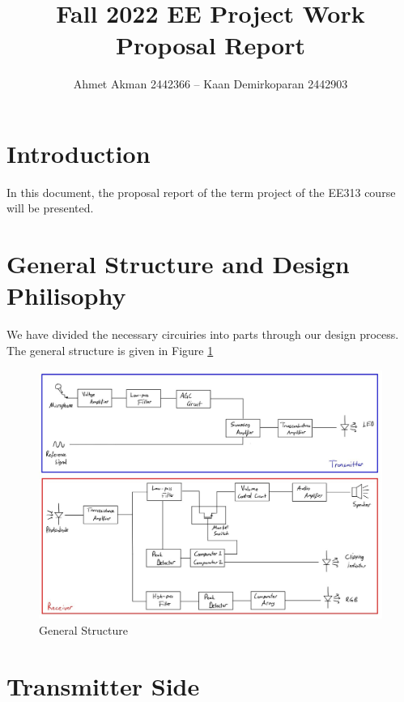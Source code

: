 \documentclass[a4paper,10pt]{IEEEtran}
\title{ \vspace{-2ex} Fall 2022 EE Project Work  \protect\\ Proposal Report}
\author{ Ahmet Akman 2442366 -- Kaan Demirkoparan 2442903 \vspace{-2ex}}
\date{}
\begin{document}
\thispagestyle{empty}
\vspace{-2cm}


\maketitle
\vspace{-5cm}

\section{Introduction}
In this document, the proposal report of the term project of the EE313 course will be presented. 
\vspace{-0.4cm}
\section{General Structure and Design Philisophy}
We have divided the necessary circuiries into parts through our design process. The general structure is given in Figure \ref*{general}
\begin{figure}[htbp!]
    \centering
    \includegraphics[width = 1\linewidth]{general_structure.jpeg}
    \caption{General Structure}
    \label{general}
\end{figure} 
\vspace{-0.8cm}
\section{Transmitter Side}
\vspace{-0.1cm}
\end{document}
